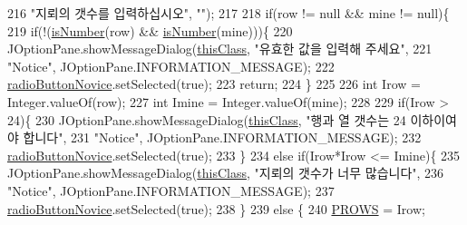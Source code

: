 \begin{DoxyCode}
216                             \textcolor{stringliteral}{"지뢰의 갯수를 입력하십시오"}, \textcolor{stringliteral}{""});
217                     
218                     \textcolor{keywordflow}{if}(row != null && mine != null)\{
219                         \textcolor{keywordflow}{if}(!(\hyperlink{classpkg_1_1main_frame_a7de04de5a18ef73c659082c62f4fd250}{isNumber}(row) && \hyperlink{classpkg_1_1main_frame_a7de04de5a18ef73c659082c62f4fd250}{isNumber}(mine)))\{
220                             JOptionPane.showMessageDialog(\hyperlink{classpkg_1_1main_frame_aa7857342de44fb7ddfa5d6e2685f71fb}{thisClass}, \textcolor{stringliteral}{"유효한 값을 입력해 주세요"},
221                                     \textcolor{stringliteral}{"Notice"}, JOptionPane.INFORMATION\_MESSAGE);
222                             \hyperlink{classpkg_1_1main_frame_a13b463f756bd15fbba342d2a810b0953}{radioButtonNovice}.setSelected(\textcolor{keyword}{true});
223                             \textcolor{keywordflow}{return};
224                         \}
225                         
226                         \textcolor{keywordtype}{int} Irow = Integer.valueOf(row);
227                         \textcolor{keywordtype}{int} Imine = Integer.valueOf(mine);
228                         
229                         \textcolor{keywordflow}{if}(Irow > 24)\{
230                             JOptionPane.showMessageDialog(\hyperlink{classpkg_1_1main_frame_aa7857342de44fb7ddfa5d6e2685f71fb}{thisClass}, \textcolor{stringliteral}{"행과 열 갯수는 24 이하이여야 합니다"},
231                                     \textcolor{stringliteral}{"Notice"}, JOptionPane.INFORMATION\_MESSAGE);
232                             \hyperlink{classpkg_1_1main_frame_a13b463f756bd15fbba342d2a810b0953}{radioButtonNovice}.setSelected(\textcolor{keyword}{true});
233                         \}
234                         \textcolor{keywordflow}{else} \textcolor{keywordflow}{if}(Irow*Irow <= Imine)\{
235                             JOptionPane.showMessageDialog(\hyperlink{classpkg_1_1main_frame_aa7857342de44fb7ddfa5d6e2685f71fb}{thisClass}, \textcolor{stringliteral}{"지뢰의 갯수가 너무 많습니다"},
236                                     \textcolor{stringliteral}{"Notice"}, JOptionPane.INFORMATION\_MESSAGE);
237                             \hyperlink{classpkg_1_1main_frame_a13b463f756bd15fbba342d2a810b0953}{radioButtonNovice}.setSelected(\textcolor{keyword}{true});
238                         \}
239                         \textcolor{keywordflow}{else} \{
240                             \hyperlink{classpkg_1_1main_frame_a6d9a76db81895214a2acaab598dc2a7c}{PROWS} = Irow;

\end{DoxyCode}
